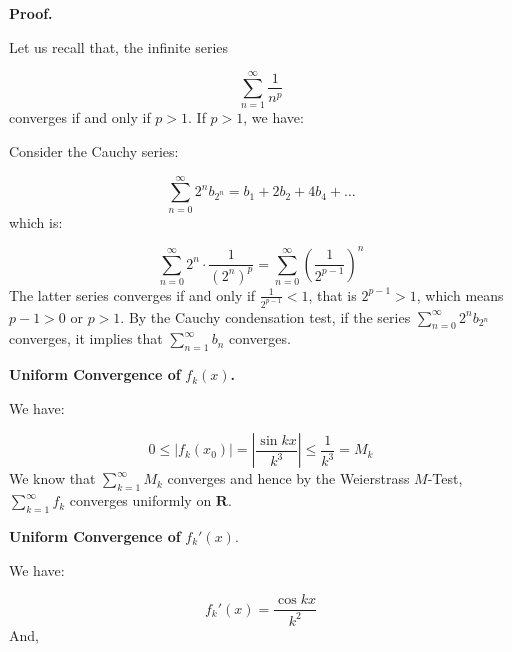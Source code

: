 \documentclass[10pt]{article}
\begin{document}
\textbf{Proof.}



Let us recall that, the infinite series


\begin{equation*}
\sum _{n=1}^{\infty }\frac{1}{n^{p}}
\end{equation*}
converges if and only if $\displaystyle p >1$. If $\displaystyle p >1$, we have:



Consider the Cauchy series:


\begin{equation*}
\sum _{n=0}^{\infty } 2^{n} b_{2^{n}} =b_{1} +2b_{2} +4b_{4} +\dotsc 
\end{equation*}
which is:


\begin{equation*}
\sum _{n=0}^{\infty } 2^{n} \cdot \frac{1}{\left( 2^{n}\right)^{p}} =\sum _{n=0}^{\infty }\left(\frac{1}{2^{p-1}}\right)^{n}
\end{equation*}
The latter series converges if and only if $\displaystyle \frac{1}{2^{p-1}} < 1$, that is $\displaystyle 2^{p-1}  >1$, which means $\displaystyle p-1 >0$ or $\displaystyle p >1$. By the Cauchy condensation test, if the series $\displaystyle \sum _{n=0}^{\infty } 2^{n} b_{2^{n}}$ converges, it implies that $\displaystyle \sum _{n=1}^{\infty } b_{n}$ converges. 



\textbf{Uniform Convergence of }$\displaystyle f_{k}( x)$\textbf{.}



We have:




\begin{equation*}
0\leq |f_{k}( x_{0}) |=\left| \frac{\sin kx}{k^{3}}\right| \leq \frac{1}{k^{3}} =M_{k}
\end{equation*}
We know that $\displaystyle \sum _{k=1}^{\infty } M_{k}$ converges and hence by the Weierstrass $\displaystyle M$-Test, $\displaystyle \sum _{k=1}^{\infty } f_{k}$ converges uniformly on $\displaystyle \mathbf{R}$.



\textbf{Uniform Convergence of }$\displaystyle f_{k} '( x)$.



We have:


\begin{equation*}
f_{k} '( x) =\frac{\cos kx}{k^{2}}
\end{equation*}
And,
\end{document}
